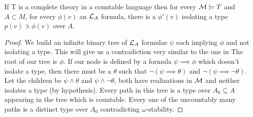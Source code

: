 \begin{lemma}\label{isolated_types_are_dense}
If T is a complete \omst theory in a countable language then for every \(\mathcal{M} \models T\) and \(A \subset M\), for every \(\phi(v)\) an \(\mathcal{L}_A\) formula, there is a \(\phi'(v)\) isolating a type \(p(v) \ni \phi(v)\) over \(A\).
\end{lemma}

\begin{proof}
We build an infinite binary tree of \(\mathcal{L}_A\) formulae \(\psi\) each implying \(\phi\) and not isolating a type.
This will give us a contradiction very similar to the one in %
The root of our tree is \(\phi\).
If our node is defined by a formula \(\psi \implies \phi\) which doesn't isolate a type, then there must be a \(\theta\) such that \(\neg(\psi \implies \theta)\) and \(\neg(\psi \implies \neg \theta)\). 
Let the children be \(\psi \land \theta\) and \(\psi \land \neg \theta\), both have realizations in \(\mathcal{M}\) and neither isolates a type (by hypothesis).
Every path in this tree is a type over \(A_0 \subseteq A\) appearing in the tree which is countable. 
Every one of the uncountably many paths is a distinct type over \(A_0\) contradicting \(\omega\)-stability. 
\end{proof}

